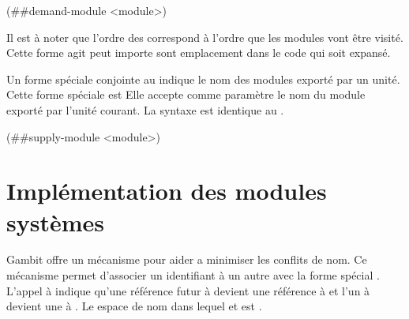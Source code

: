 \begin{center}
  \begin{mplisting}{0.8}
(##demand-module <module>)
\end{mplisting}
\end{center}

Il est à noter que l'ordre des  correspond à l'ordre
que les modules vont être visité. Cette forme agit peut importe sont emplacement
dans le code qui soit expansé.



Un forme spéciale conjointe au  indique le nom
des modules exporté par un unité. Cette forme spéciale est 
Elle accepte comme paramètre le nom du module exporté par l'unité courant.
La syntaxe est identique au .

\begin{center}
  \begin{mplisting}{0.8}
(##supply-module <module>)
\end{mplisting}
\end{center}

\section{Implémentation des modules systèmes}


Gambit offre un mécanisme pour aider a minimiser les conflits de nom. Ce
mécanisme permet d'associer un identifiant à un autre avec la forme spécial
.  L'appel à  indique
qu'une référence futur à  devient une référence à
 et l'un à  devient une à . Le espace
de nom dans lequel  et  est .

